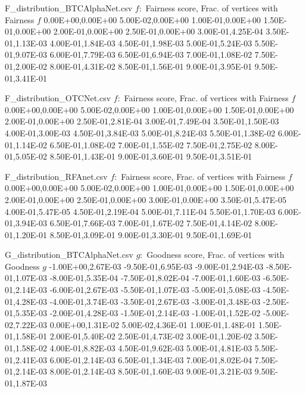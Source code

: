 \begin{filecontents*}{F_distribution_BTCAlphaNet.csv}
$f:$ Fairness score, Frac. of vertices with Fairness $f$
0.00E+00,0.00E+00
5.00E-02,0.00E+00
1.00E-01,0.00E+00
1.50E-01,0.00E+00
2.00E-01,0.00E+00
2.50E-01,0.00E+00
3.00E-01,4.25E-04
3.50E-01,1.13E-03
4.00E-01,1.84E-03
4.50E-01,1.98E-03
5.00E-01,5.24E-03
5.50E-01,9.07E-03
6.00E-01,7.79E-03
6.50E-01,6.94E-03
7.00E-01,1.08E-02
7.50E-01,2.00E-02
8.00E-01,4.31E-02
8.50E-01,1.56E-01
9.00E-01,3.95E-01
9.50E-01,3.41E-01
\end{filecontents*}

\begin{filecontents*}{F_distribution_OTCNet.csv}
$f:$ Fairness score, Frac. of vertices with Fairness $f$
0.00E+00,0.00E+00
5.00E-02,0.00E+00
1.00E-01,0.00E+00
1.50E-01,0.00E+00
2.00E-01,0.00E+00
2.50E-01,2.81E-04
3.00E-01,7.49E-04
3.50E-01,1.50E-03
4.00E-01,3.00E-03
4.50E-01,3.84E-03
5.00E-01,8.24E-03
5.50E-01,1.38E-02
6.00E-01,1.14E-02
6.50E-01,1.08E-02
7.00E-01,1.55E-02
7.50E-01,2.75E-02
8.00E-01,5.05E-02
8.50E-01,1.43E-01
9.00E-01,3.60E-01
9.50E-01,3.51E-01
\end{filecontents*}

\begin{filecontents*}{F_distribution_RFAnet.csv}
$f:$ Fairness score, Frac. of vertices with Fairness $f$
0.00E+00,0.00E+00
5.00E-02,0.00E+00
1.00E-01,0.00E+00
1.50E-01,0.00E+00
2.00E-01,0.00E+00
2.50E-01,0.00E+00
3.00E-01,0.00E+00
3.50E-01,5.47E-05
4.00E-01,5.47E-05
4.50E-01,2.19E-04
5.00E-01,7.11E-04
5.50E-01,1.70E-03
6.00E-01,3.94E-03
6.50E-01,7.66E-03
7.00E-01,1.67E-02
7.50E-01,4.14E-02
8.00E-01,1.20E-01
8.50E-01,3.09E-01
9.00E-01,3.30E-01
9.50E-01,1.69E-01
\end{filecontents*}

\begin{filecontents*}{G_distribution_BTCAlphaNet.csv}
$g:$ Goodness score, Frac. of vertices with Goodness $g$
-1.00E+00,2.67E-03
-9.50E-01,6.95E-03
-9.00E-01,2.94E-03
-8.50E-01,1.07E-03
-8.00E-01,5.35E-04
-7.50E-01,8.02E-04
-7.00E-01,1.60E-03
-6.50E-01,2.14E-03
-6.00E-01,2.67E-03
-5.50E-01,1.07E-03
-5.00E-01,5.08E-03
-4.50E-01,4.28E-03
-4.00E-01,3.74E-03
-3.50E-01,2.67E-03
-3.00E-01,3.48E-03
-2.50E-01,5.35E-03
-2.00E-01,4.28E-03
-1.50E-01,2.14E-03
-1.00E-01,1.52E-02
-5.00E-02,7.22E-03
0.00E+00,1.31E-02
5.00E-02,4.36E-01
1.00E-01,1.48E-01
1.50E-01,1.58E-01
2.00E-01,5.40E-02
2.50E-01,4.73E-02
3.00E-01,1.20E-02
3.50E-01,1.58E-02
4.00E-01,8.82E-03
4.50E-01,9.62E-03
5.00E-01,4.81E-03
5.50E-01,2.41E-03
6.00E-01,2.14E-03
6.50E-01,1.34E-03
7.00E-01,8.02E-04
7.50E-01,2.14E-03
8.00E-01,2.14E-03
8.50E-01,1.60E-03
9.00E-01,3.21E-03
9.50E-01,1.87E-03
\end{filecontents*}

